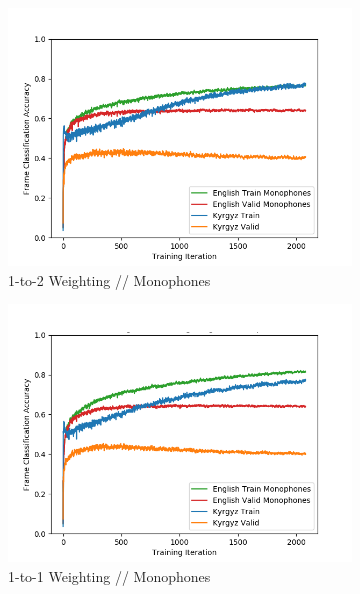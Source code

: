 \documentclass[a4paper]{article}
\begin{document}
\begin{figure}[!htbp]
\centering
\begin{subfigure}{.33\textwidth}
  \centering
  \includegraphics[width=1\textwidth,keepaspectratio]{figs-1/2-to-1-mono.png}
  \caption{1-to-2 Weighting // Monophones}
  \label{fig:sub1}
\end{subfigure}%
\begin{subfigure}{.33\textwidth}
  \centering
  \includegraphics[width=1\textwidth,keepaspectratio]{figs-1/1-to-1-mono.png}
  \caption{1-to-1 Weighting // Monophones}
  \label{fig:sub2}
\end{subfigure}%
\begin{subfigure}{.33\textwidth}
  \centering

\end{subfigure}
\end{figure}
\end{document}
